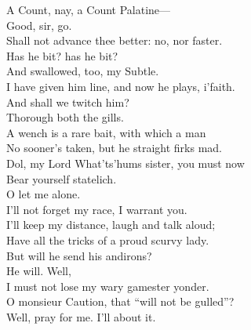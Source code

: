 \documentclass[a4paper,oneside,12pt]{memoir}
\begin{document}
\begin{drama*}
\mammonspeaks A Count, nay, a Count Palatine---\\
\facespeaks {} Good, sir, go.\\
\mammonspeaks Shall not advance thee better: no, nor faster.\\
\subtlespeaks Has he bit? has he bit?\\
\facespeaks {} And swallowed, too, my Subtle.\\
I have given him line, and now he plays, i'faith.\\
\subtlespeaks And shall we twitch him?\\
\facespeaks {} Thorough both the gills.\\
A wench is a rare bait, with which a man\\
No sooner's taken, but he straight firks mad.\\
\subtlespeaks Dol, my Lord What'ts'hums sister, you must now\\
Bear yourself statelich.\\
\dolspeaks {} O let me alone.\\
I'll not forget my race, I warrant you.\\
I'll keep my distance, laugh and talk aloud;\\
Have all the tricks of a proud scurvy lady.\\
\subtlespeaks But will he send his andirons?\\
\facespeaks {} He will. Well,\\
I must not lose my wary gamester yonder.\\
\subtlespeaks O monsieur Caution, that ``will not be gulled''?\\
\facespeaks Well, pray for me. I'll about it.\\

\scene


\end{drama*}
\end{document}
